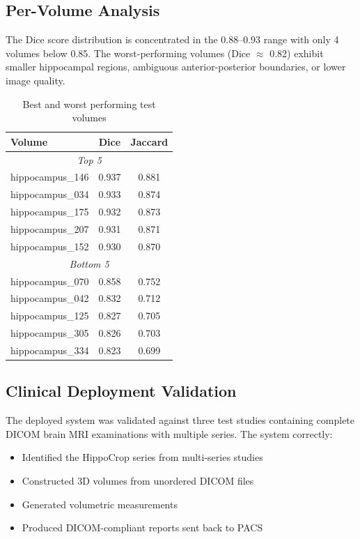\documentclass[12pt,a4paper,twocolumn]{article}
\begin{document}
\subsection{Per-Volume Analysis}

The Dice score distribution is concentrated in the 0.88--0.93 range with only 4 volumes below 0.85. The worst-performing volumes (Dice $\approx$ 0.82) exhibit smaller hippocampal regions, ambiguous anterior-posterior boundaries, or lower image quality.

\begin{table}[H]
\centering
\small
\begin{tabular}{lcc}
\toprule
\textbf{Volume} & \textbf{Dice} & \textbf{Jaccard} \\
\midrule
\multicolumn{3}{c}{\textit{Top 5}} \\
hippocampus\_146 & 0.937 & 0.881 \\
hippocampus\_034 & 0.933 & 0.874 \\
hippocampus\_175 & 0.932 & 0.873 \\
hippocampus\_207 & 0.931 & 0.871 \\
hippocampus\_152 & 0.930 & 0.870 \\
\midrule
\multicolumn{3}{c}{\textit{Bottom 5}} \\
hippocampus\_070 & 0.858 & 0.752 \\
hippocampus\_042 & 0.832 & 0.712 \\
hippocampus\_125 & 0.827 & 0.705 \\
hippocampus\_305 & 0.826 & 0.703 \\
hippocampus\_334 & 0.823 & 0.699 \\
\bottomrule
\end{tabular}
\caption{Best and worst performing test volumes}
\end{table}

\subsection{Clinical Deployment Validation}

The deployed system was validated against three test studies containing complete DICOM brain MRI examinations with multiple series. The system correctly:
\begin{itemize}[nosep]
    \item Identified the HippoCrop series from multi-series studies
    \item Constructed 3D volumes from unordered DICOM files
    \item Generated volumetric measurements
    \item Produced DICOM-compliant reports sent back to PACS
\end{itemize}
\end{document}
